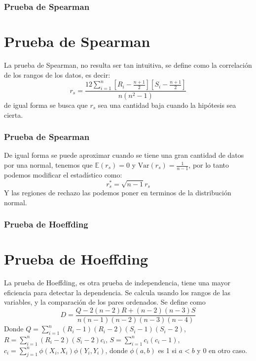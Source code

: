 \documentclass[aspectratio=169,spanish]{beamer}
\begin{document}
\begin{frame}
\frametitle{Prueba de Spearman}
\section{Prueba de Spearman}
La prueba de Spearman, no resulta ser tan intuitiva, se define como la correlación de los rangos de los datos, es decir:
$$ r_s = \frac{12\sum_{i=1}^{n}[R_i -\frac{n+1}{2}][S_i -\frac{n+1}{2}]}{n(n^2-1)}$$
de igual forma se busca que $ r_s$ sea una cantidad baja cuando la hipótesis sea cierta.
\end{frame}


\begin{frame}
\frametitle{Prueba de Spearman}
De igual forma se puede aproximar cuando se tiene una gran cantidad de datos por una normal, tenemos que $\mathbb{E}(r_s)=0$ y $\text{Var}(r_s)=\frac{1}{n-1}$, por lo tanto podemos modificar el estadístico como:
$$ r_s^* = \sqrt{n-1}r_s$$
Y las regiones de rechazo las podemos poner en terminos de la distribución normal.
\end{frame}


\begin{frame}
\frametitle{Prueba de Hoeffding}
\section{Prueba de Hoeffding}
La prueba de Hoeffding, es otra prueba de independencia, tiene una mayor eficiencia para detectar la dependencia. Se calcula usando los rangos de las variables, y la comparación de los pares ordenados. Se define como $$D=\frac{Q-2(n-2)R+(n-2)(n-3)S}{n(n-1)(n-2)(n-3)(n-4)}$$
Donde $Q=\sum_{i=1}^{n}(R_i-1)(R_i-2)(S_i-1)(S_i-2)$, $R=\sum_{i=1}^{n}(R_i-2)(S_i-2)c_i$, $S=\sum_{i=1}^{n}c_i(c_i-1)$, $c_i=\sum_{j=1}^{n}\phi(X_i,X_i)\phi(Y_i,Y_i)$, donde $\phi(a,b)$ es 1 si $a<b$ y 0 en otro caso.
\end{frame}
\end{document}

